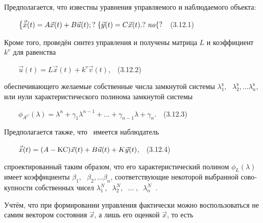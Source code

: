 \documentclass[a4paper]{article}
\newcommand\normalsubformula[1]{\text{\mathversion{normal}$#1$}}
\begin{document}
{\begin{russian}\sffamily
Предполагается, что известны уравнения управляемого и наблюдаемого объекта:
\end{russian}}

{\begin{russian}\sffamily
\ \ \ \  $\begin{matrix}\left\{\vec{\dot x}(t)=A\vec x(t)+B\vec u(t);?\right.\left\{\vec y(t)=C\vec
x(t).?\right.\mathit{no}\hfill\null \end{matrix}\{?$\ \ (3.12.1)
\end{russian}}

{\begin{russian}\sffamily
Кроме того, проведён синтез управления и получены матрица  $L$ и коэффициент  $k^v$ для равенства
\end{russian}}

{\begin{russian}\sffamily
\ \ \ \  $\vec u(t)=L\vec x(t)+k^v\vec v(t)$,\ \ (3.12.2)
\end{russian}}

{\begin{russian}\sffamily
обеспечивающего желаемые собственные числа замкнутой системы  $λ_1^з,\text{  }λ_2^з,...λ_n^з$, или нули
характеристического полинома замкнутой системы
\end{russian}}

{\begin{russian}\sffamily
\ \ \ \  $ϕ_{A^C}(λ)=λ^n+γ_1λ^{n-1}+...+γ_{n-1}λ+γ_n$.\ \ (3.12.3)
\end{russian}}

{\begin{russian}\sffamily
Предполагается также, что \ имеется наблюдатель
\end{russian}}

{\begin{russian}\sffamily
\ \ \ \  $\vec{\dot x}(t)=(A-\normalsubformula{\text{KC}})\vec x(t)+B\vec u(t)+K\vec y(t)$,\ \ (3.12.4)
\end{russian}}

{\begin{russian}\sffamily
спроектированный таким образом, что его характеристический поли­ном  $ϕ_L(λ)$ имеет коэффициенты  $β_1,\text{ 
}β_2,...β_n$, соответствующие некоторой выбранной совокупности собственных чисел 
$λ_1^N,\;\;λ_2^N,\;\;...\;,\;\;λ_n^N\;\;$.
\end{russian}}

{\begin{russian}\sffamily
Учтём, что при формировании управления фактически можно воспользоваться не самим вектором состояния  $\vec x$, а лишь
его оценкой  $\vec x$, то есть
\end{russian}}
\end{document}
